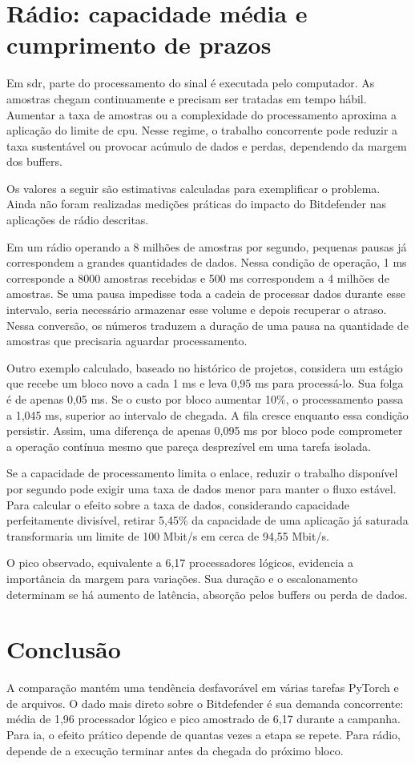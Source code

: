 \documentclass[11pt,a4paper]{article}
\begin{document}
\section{Rádio: capacidade média e cumprimento de prazos}
Em \ac{sdr}, parte do processamento do sinal é executada pelo computador. As amostras chegam continuamente e precisam ser tratadas em tempo hábil. Aumentar a taxa de amostras ou a complexidade do processamento aproxima a aplicação do limite de \ac{cpu}. Nesse regime, o trabalho concorrente pode reduzir a taxa sustentável ou provocar acúmulo de dados e perdas, dependendo da margem dos buffers.

Os valores a seguir são estimativas calculadas para exemplificar o problema. Ainda não foram realizadas medições práticas do impacto do Bitdefender nas aplicações de rádio descritas.

Em um rádio operando a 8 milhões de amostras por segundo, pequenas pausas já correspondem a grandes quantidades de dados. Nessa condição de operação, 1 ms corresponde a 8000 amostras recebidas e 500 ms correspondem a 4 milhões de amostras. Se uma pausa impedisse toda a cadeia de processar dados durante esse intervalo, seria necessário armazenar esse volume e depois recuperar o atraso. Nessa conversão, os números traduzem a duração de uma pausa na quantidade de amostras que precisaria aguardar processamento.

Outro exemplo calculado, baseado no histórico de projetos, considera um estágio que recebe um bloco novo a cada 1 ms e leva 0,95 ms para processá-lo. Sua folga é de apenas 0,05 ms. Se o custo por bloco aumentar 10\%, o processamento passa a 1,045 ms, superior ao intervalo de chegada. A fila cresce enquanto essa condição persistir. Assim, uma diferença de apenas 0,095 ms por bloco pode comprometer a operação contínua mesmo que pareça desprezível em uma tarefa isolada.

Se a capacidade de processamento limita o enlace, reduzir o trabalho disponível por segundo pode exigir uma taxa de dados menor para manter o fluxo estável. Para calcular o efeito sobre a taxa de dados, considerando capacidade perfeitamente divisível, retirar 5,45\% da capacidade de uma aplicação já saturada transformaria um limite de 100 Mbit/s em cerca de 94,55 Mbit/s.

O pico observado, equivalente a 6,17 processadores lógicos, evidencia a importância da margem para variações. Sua duração e o escalonamento determinam se há aumento de latência, absorção pelos buffers ou perda de dados.

\section{Conclusão}
A comparação mantém uma tendência desfavorável em várias tarefas PyTorch e de arquivos. O dado mais direto sobre o Bitdefender é sua demanda concorrente: média de 1,96 processador lógico e pico amostrado de 6,17 durante a campanha. Para \ac{ia}, o efeito prático depende de quantas vezes a etapa se repete. Para rádio, depende de a execução terminar antes da chegada do próximo bloco.
\end{document}
